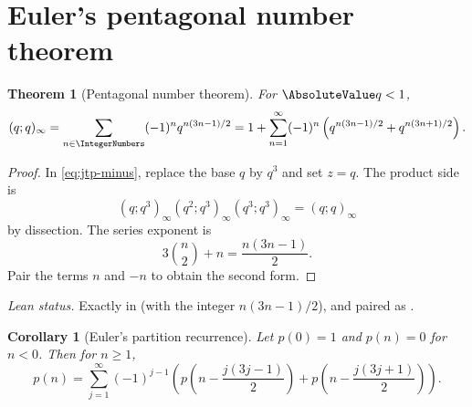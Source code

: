 \documentclass[11pt,a4paper,oneside,openany]{book}
\newtheorem{theorem}{Theorem}[chapter]
\newtheorem{corollary}[corollary]{Corollary}
\theoremstyle{definition}
\theoremstyle{remark}
\begin{document}
\section{Euler's pentagonal number theorem}

\begin{theorem}[Pentagonal number theorem]\label{thm:pentagonal}
For $\AbsoluteValue q<1$,
\[
 (q;q)_\infty
 =\sum_{n\in\IntegerNumbers}(-1)^nq^{n(3n-1)/2}
 =1+\sum_{n=1}^{\infty}(-1)^n
 \left(q^{n(3n-1)/2}+q^{n(3n+1)/2}\right).
\]
\end{theorem}

\begin{proof}
In \eqref{eq:jtp-minus}, replace the base $q$ by $q^3$ and set $z=q$.  The product side is
\[
 (q;q^3)_\infty(q^2;q^3)_\infty(q^3;q^3)_\infty=(q;q)_\infty
\]
by dissection.  The series exponent is
\[
 3\binom n2+n=\frac{n(3n-1)}2.
\]
Pair the terms $n$ and $-n$ to obtain the second form.
\end{proof}

\emph{Lean status.}  Exactly  in
 (with  the integer
$n(3n-1)/2$), and paired as .


\begin{corollary}[Euler's partition recurrence]\label{cor:euler-partition-recurrence}
Let $p(0)=1$ and $p(n)=0$ for $n<0$.  Then for $n\ge1$,
\[
 p(n)=\sum_{j=1}^{\infty}(-1)^{j-1}
 \left(p\!\left(n-\frac{j(3j-1)}2\right)
 +p\!\left(n-\frac{j(3j+1)}2\right)\right).
\]
\end{corollary}
\end{document}
